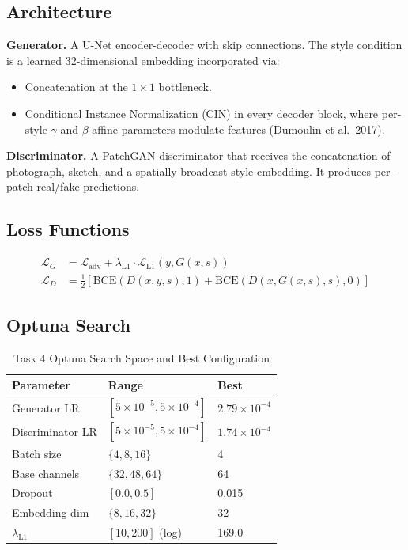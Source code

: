 \documentclass[conference]{IEEEtran}
\begin{document}
\subsection{Architecture}

\textbf{Generator.} A U-Net encoder-decoder with skip connections. The style condition is a learned 32-dimensional embedding incorporated via:
\begin{itemize}
    \item Concatenation at the $1 \times 1$ bottleneck.
    \item Conditional Instance Normalization (CIN) in every decoder block, where per-style $\gamma$ and $\beta$ affine parameters modulate features (Dumoulin et al.\ 2017).
\end{itemize}

\textbf{Discriminator.} A PatchGAN discriminator that receives the concatenation of photograph, sketch, and a spatially broadcast style embedding. It produces per-patch real/fake predictions.

\subsection{Loss Functions}

\begin{align}
    \mathcal{L}_G &= \mathcal{L}_{\text{adv}} + \lambda_{\text{L1}} \cdot \mathcal{L}_{\text{L1}}(y, G(x, s)) \\
    \mathcal{L}_D &= \frac{1}{2}\left[\text{BCE}(D(x, y, s), 1) + \text{BCE}(D(x, G(x,s), s), 0)\right]
\end{align}

\subsection{Optuna Search}

\begin{table}[h]
\centering
\caption{Task 4 Optuna Search Space and Best Configuration}
\label{tab:t4optuna}
\begin{tabular}{lll}
\toprule
Parameter & Range & Best \\
\midrule
Generator LR & $[5 \times 10^{-5}, 5 \times 10^{-4}]$ & $2.79 \times 10^{-4}$ \\
Discriminator LR & $[5 \times 10^{-5}, 5 \times 10^{-4}]$ & $1.74 \times 10^{-4}$ \\
Batch size & $\{4, 8, 16\}$ & 4 \\
Base channels & $\{32, 48, 64\}$ & 64 \\
Dropout & $[0.0, 0.5]$ & 0.015 \\
Embedding dim & $\{8, 16, 32\}$ & 32 \\
$\lambda_{\text{L1}}$ & $[10, 200]$ (log) & 169.0 \\
\bottomrule
\end{tabular}
\end{table}
\end{document}
